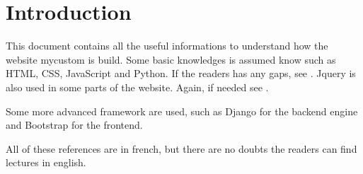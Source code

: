 \section{Introduction}

This document contains all the useful informations to understand how the website mycustom is build. Some basic knowledges is assumed know such as HTML, CSS, JavaScript and Python. If the readers has any gaps, see \cite{Javascript, Python, HTML_CSS, CSS_Advanced}. Jquery is also used in some parts of the website. Again, if needed see \cite{Jquery}.

Some more advanced framework are used, such as Django \cite{Django} for the backend engine and Bootstrap \cite{Bootstrap} for the frontend. 

 All of these references are in french, but there are no doubts the readers can find lectures in english. 